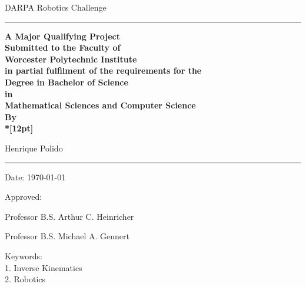 \documentclass[12pt]{report}
\begin{document}
\rule{0pt}{1.1in}


\begin{center}
{\Huge DARPA Robotics Challenge}

\vspace{0.4in}

\rule{2.1in}{0.1pt}

\vspace{0.5cm}


\textbf{A Major Qualifying Project\\
Submitted to the Faculty of\\
Worcester Polytechnic Institute\\
in partial fulfilment of the requirements for the\\
Degree in Bachelor of Science\\
in\\
Mathematical Sciences
and
Computer Science\\
By
\\*[12pt]}

Henrique Polido\\
\vspace{0.7cm}
\rule{2.1in}{0.1pt}
\vspace{0.5cm}


\end{center}
\vspace{0.5cm}  Date:  \today

\begin{center}
Approved: \vspace{0.5cm}
\end{center}

\hfill \underline{ \hspace{3in}}

\hfill Professor B.S. Arthur C. Heinricher~~

\hfill \underline{ \hspace{3in}}

\hfill Professor B.S. Michael A. Gennert~~

\vspace{ 0.5cm}

\noindent Keywords:\\
1. Inverse Kinematics \\
2. Robotics \\
\end{document}
